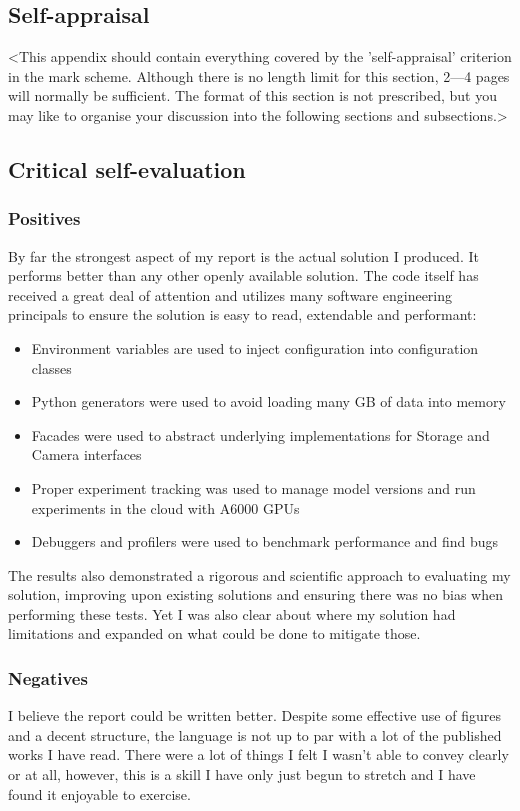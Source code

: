 \begin{appendices}

%
%
\chapter{Self-appraisal}

<This appendix should contain everything covered by the 'self-appraisal' criterion in the mark scheme. Although there is no length limit for this section, 2---4 pages will normally be sufficient. The format of this section is not prescribed, but you may like to organise your discussion into the following sections and subsections.>

\section{Critical self-evaluation}
\subsection{Positives}
By far the strongest aspect of my report is the actual solution I produced.  It performs better than any other openly available solution.  
The code itself has received a great deal of attention and utilizes many software engineering principals to ensure the solution is easy to 
read, extendable and performant:  
\begin{itemize}
    \item Environment variables are used to inject configuration into configuration classes  
    \item Python generators were used to avoid loading many GB of data into memory  
    \item Facades were used to abstract underlying implementations for Storage and Camera interfaces  
    \item Proper experiment tracking was used to manage model versions and run experiments in the cloud with A6000 GPUs
    \item Debuggers and profilers were used to benchmark performance and find bugs
\end{itemize}
The results also demonstrated a rigorous and scientific approach to evaluating my solution, improving upon existing solutions and ensuring there was 
no bias when performing these tests.  Yet I was also clear about where my solution had limitations and expanded on what could be done 
to mitigate those.

\subsection{Negatives}
I believe the report could be written better.  Despite some effective use of figures and a decent structure, the language is not up to par with 
a lot of the published works I have read.  There were a lot of things I felt I wasn't able to convey clearly or at all, however, this is a skill I have 
only just begun to stretch and I have found it enjoyable to exercise.


\end{appendices}
